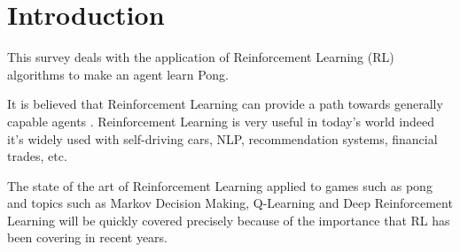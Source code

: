 \section{Introduction}

This survey deals with the application of Reinforcement Learning (RL) algorithms to make an agent learn Pong.

It is believed that Reinforcement Learning can provide a path towards generally capable agents \cite{silver2021reward}\cite{parker2022automated}.
Reinforcement Learning is very useful in today's world indeed it's widely used with self-driving cars, NLP, recommendation systems, financial trades, etc.

The state of the art of Reinforcement Learning applied to games such as pong and topics such as Markov Decision Making, Q-Learning and Deep Reinforcement Learning will be quickly covered precisely because of the importance that RL has been covering in recent years.





